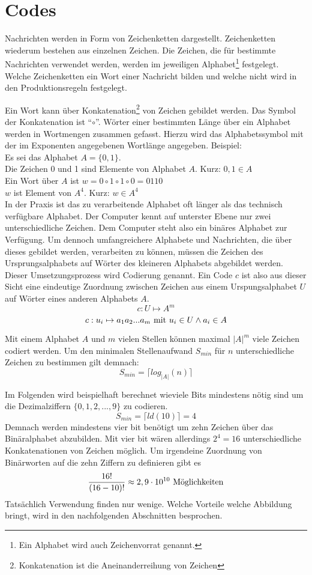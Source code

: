 \chapter{Codes}
Nachrichten werden in Form von Zeichenketten dargestellt. Zeichenketten wiederum bestehen aus einzelnen Zeichen. Die Zeichen, die für bestimmte Nachrichten verwendet werden, werden im jeweiligen Alphabet\footnote{Ein Alphabet wird auch Zeichenvorrat genannt.} festgelegt. Welche Zeichenketten ein Wort einer Nachricht bilden und welche nicht wird in den Produktionsregeln festgelegt.

Ein Wort kann über Konkatenation\footnote{Konkatenation ist die Aneinanderreihung von Zeichen} von Zeichen gebildet werden. Das Symbol der Konkatenation ist "`$\circ$"'. Wörter einer bestimmten Länge über ein Alphabet werden in Wortmengen zusammen gefasst. Hierzu wird das Alphabetssymbol mit der im Exponenten angegebenen Wortlänge angegeben.
Beispiel: \\
Es sei das Alphabet $A = \{0, 1\}$. \\
Die Zeichen 0 und 1 sind Elemente von Alphabet $A$. Kurz: $0,1 \in A$ \\
Ein Wort über $A$ ist $w = 0 \circ 1 \circ 1 \circ 0 = 0110$ \\
$w$ ist Element von $A^4$. Kurz: $w \in A^4$ \\

In der Praxis ist das zu verarbeitende Alphabet oft länger als das technisch verfügbare Alphabet. Der Computer kennt auf unterster Ebene nur zwei unterschiedliche Zeichen. Dem Computer steht also ein binäres Alphabet zur Verfügung. Um dennoch umfangreichere Alphabete und Nachrichten, die über dieses gebildet werden, verarbeiten zu können, müssen die Zeichen des Ursprungsalphabets auf Wörter des kleineren Alphabets abgebildet werden. Dieser Umsetzungsprozess wird Codierung genannt. Ein Code $c$ ist also aus dieser Sicht eine eindeutige Zuordnung zwischen Zeichen aus einem Urspungsalphabet $U$ auf Wörter eines anderen Alphabets $A$.
$$c: U \mapsto A^m$$
$$c: u_i \mapsto a_1a_2...a_m 
	\textnormal{ mit } u_i \in U \wedge a_i \in A$$

Mit einem Alphabet $A$ und $m$ vielen Stellen können maximal $|A|^m$ viele Zeichen codiert werden. Um den minimalen Stellenaufwand $S_{min}$ für $n$ unterschiedliche Zeichen zu bestimmen gilt demnach:
$$ S_{min} = \lceil log_{|A|}(n) \rceil $$

Im Folgenden wird beispielhaft berechnet wieviele Bits mindestens nötig sind um die Dezimalziffern $\{0,1,2, ... , 9\}$ zu codieren.
$$S_{min} = \lceil ld(10) \rceil = 4$$
Demnach werden mindestens vier bit benötigt um zehn Zeichen über das Binäralphabet abzubilden. Mit vier bit wären allerdings $2^4 = 16$ unterschiedliche Konkatenationen von Zeichen möglich. Um irgendeine Zuordnung von Binärworten auf die zehn Ziffern zu definieren gibt es 
$$ \frac{16!}{(16 - 10)!} \approx 2,9 \cdot 10^{10} \textnormal{ Möglichkeiten} $$
Tatsächlich Verwendung finden nur wenige. Welche Vorteile welche Abbildung bringt, wird in den nachfolgenden Abschnitten besprochen.

